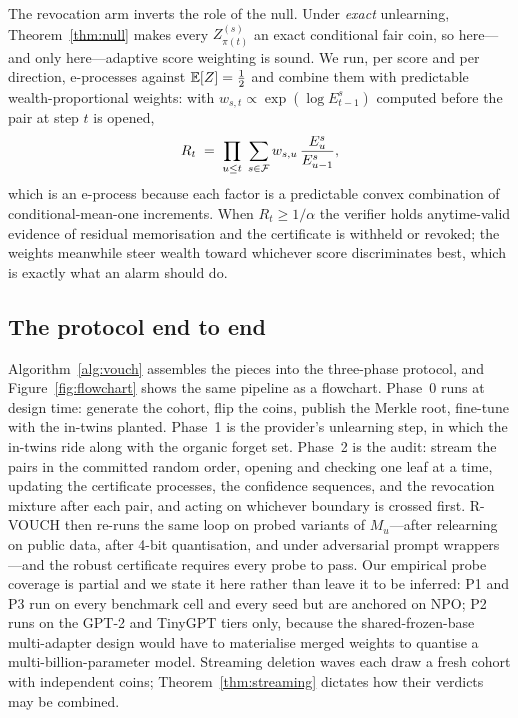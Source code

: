 The revocation arm inverts the role of the null. Under \emph{exact} unlearning,
Theorem~\ref{thm:null} makes every $Z_{\pi(t)}^{(s)}$ an exact conditional fair coin,
so here---and only here---adaptive score weighting is sound. We run, per score and per
direction, e-processes against $\mathbb{E}[Z] = \tfrac12$ and combine them with predictable
wealth-proportional weights: with $w_{s,t} \propto \exp(\log E^{s}_{t-1})$ computed
before the pair at step $t$ is opened,
\begin{equation}\label{eq:revmix}
R_t \;=\; \prod_{u\le t}\;\sum_{s\in\mathcal{F}} w_{s,u}\,
\frac{E^{s}_{u}}{E^{s}_{u-1}},
\end{equation}
which is an e-process because each factor is a predictable convex combination of
conditional-mean-one increments. When $R_t \ge 1/\alpha$ the verifier holds
anytime-valid evidence of residual memorisation and the certificate is withheld or
revoked; the weights meanwhile steer wealth toward whichever score discriminates best,
which is exactly what an alarm should do.

\subsection{The protocol end to end}\label{sec:protocol}

Algorithm~\ref{alg:vouch} assembles the pieces into the three-phase protocol, and
Figure~\ref{fig:flowchart} shows the same pipeline as a flowchart. Phase~0 runs at
design time: generate the cohort, flip the coins, publish the Merkle root, fine-tune
with the in-twins planted. Phase~1 is the provider's unlearning step, in which the
in-twins ride along with the organic forget set. Phase~2 is the audit: stream the
pairs in the committed random order, opening and checking one leaf at a time, updating
the certificate processes, the confidence sequences, and the revocation mixture after
each pair, and acting on whichever boundary is crossed first. R-VOUCH then re-runs the
same loop on probed variants of $M_u$---after relearning on public data, after 4-bit
quantisation, and under adversarial prompt wrappers---and the robust certificate
requires every probe to pass. Our empirical probe coverage is partial and we state it
here rather than leave it to be inferred: P1 and P3 run on every benchmark cell and
every seed but are anchored on NPO; P2 runs on the GPT-2 and TinyGPT tiers only,
because the shared-frozen-base multi-adapter design would have to materialise merged
weights to quantise a multi-billion-parameter model. Streaming deletion waves each draw a fresh cohort with
independent coins; Theorem~\ref{thm:streaming} dictates how their verdicts may be
combined.
